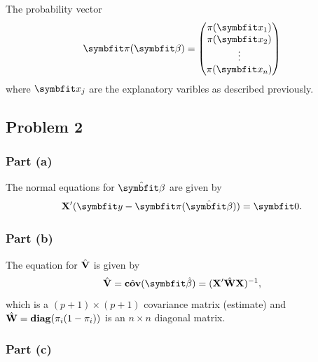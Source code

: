 \documentclass[
  11pt,
]{article}
\begin{document}
The probability vector \[
\v{\pi}(\v{\beta}) =
\begin{pmatrix}
  \pi(\v{x_1})\\
  \pi(\v{x_2})\\
  \vdots\\
  \pi(\v{x_n})\\
\end{pmatrix}
\] where \(\v{x_j}\) are the explanatory varibles as described
previously.

\hypertarget{problem-2}{%
\subsection{Problem 2}\label{problem-2}}

\hypertarget{part-a}{%
\subsubsection{Part (a)}\label{part-a}}


The normal equations for \(\hat{\v{\beta}}\) are given by \[
  \mat{X}'(\v{y} - \v{\pi}(\hat{\v{\beta}})) = \v{0}.
\]

\hypertarget{part-b}{%
\subsubsection{Part (b)}\label{part-b}}


The equation for \(\hat{\mathbf{V}}\) is given by \[
  \hat{\mat{V}} = \hat{\operatorname{\mat{cov}}}(\v{\hat{\beta}}) = (\mat{X}' \hat{\mat{W}} \mat{X})^{-1},
\] which is a \((p+1) \times (p+1)\) covariance matrix (estimate) and
\(\hat{\mathbf{W}} = \operatorname{\mathbf{diag}}(\pi_i(1-\pi_i))\) is an
\(n \times n\) diagonal matrix.

\hypertarget{part-c}{%
\subsubsection{Part (c)}\label{part-c}}
\end{document}
